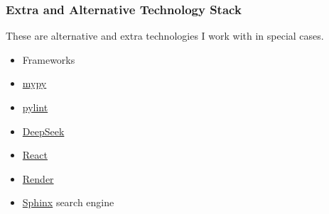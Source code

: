 \documentclass[a4paper,8pt]{extarticle}
\begin{document}
\subsubsection{Extra and Alternative Technology Stack}
These are alternative and extra technologies I work with in special cases.
\begin{itemize}
    \item Frameworks
    \item \href{https://mypy-lang.org/}{mypy}
    \item \href{https://www.pylint.org/}{pylint}
    \item \href{https://www.deepseek.com/}{DeepSeek}
    \item \href{https://react.dev/}{React}
    \item \href{https://render.com/}{Render}
    \item \href{https://sphinxsearch.com/}{Sphinx} search engine
\end{itemize}
\end{document}
